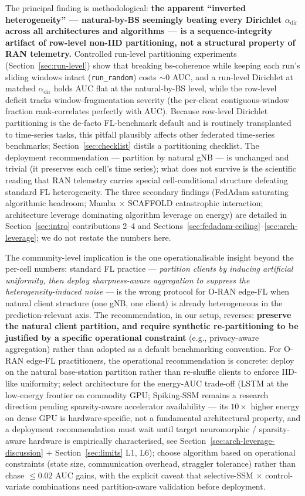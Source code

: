 \documentclass[journal]{IEEEtran}
\newcommand{\alphadir}{\ensuremath{\alpha_{\mathrm{dir}}}}
\begin{document}
The principal finding is methodological: \textbf{the apparent ``inverted heterogeneity'' --- natural-by-BS seemingly beating every Dirichlet $\alphadir$ across all architectures and algorithms --- is a sequence-integrity artifact of row-level non-IID partitioning, not a structural property of RAN telemetry.} Controlled run-level partitioning experiments (Section~\ref{sec:run-level}) show that breaking bs-coherence while keeping each run's sliding windows intact (\lstinline|run_random|) costs ${\sim}0$ AUC, and a run-level Dirichlet at matched $\alphadir$ holds AUC flat at the natural-by-BS level, while the row-level deficit tracks window-fragmentation severity (the per-client contiguous-window fraction rank-correlates perfectly with AUC). Because row-level Dirichlet partitioning is the de-facto FL-benchmark default and is routinely transplanted to time-series tasks, this pitfall plausibly affects other federated time-series benchmarks; Section~\ref{sec:checklist} distils a partitioning checklist. The deployment recommendation --- partition by natural gNB --- is unchanged and trivial (it preserves each cell's time series); what does not survive is the scientific reading that RAN telemetry carries special cell-conditional structure defeating standard FL heterogeneity. The three secondary findings (FedAdam saturating algorithmic headroom; Mamba $\times$ SCAFFOLD catastrophic interaction; architecture leverage dominating algorithm leverage on energy) are detailed in Section~\ref{sec:intro} contributions 2--4 and Sections~\ref{sec:fedadam-ceiling}--\ref{sec:arch-leverage}; we do not restate the numbers here.

The community-level implication is the one operationalisable insight beyond the per-cell numbers: standard FL practice --- \emph{partition clients by inducing artificial uniformity, then deploy sharpness-aware aggregation to suppress the heterogeneity-induced noise} --- is the wrong protocol for O-RAN edge-FL when natural client structure (one gNB, one client) is already heterogeneous in the prediction-relevant axis. The recommendation, in our setup, reverses: \textbf{preserve the natural client partition, and require synthetic re-partitioning to be justified by a specific operational constraint} (e.g., privacy-aware aggregation) rather than adopted as a default benchmarking convention. For O-RAN edge-FL practitioners, the operational recommendation is concrete: deploy on the natural base-station partition rather than re-shuffle clients to enforce IID-like uniformity; select architecture for the energy-AUC trade-off (LSTM at the low-energy frontier on commodity GPU; Spiking-SSM remains a research direction pending sparsity-aware accelerator availability --- its $10\times$ higher energy on dense GPU is hardware-specific, not a fundamental architectural property, and a deployment recommendation must wait until target neuromorphic / sparsity-aware hardware is empirically characterised, see Section~\ref{sec:arch-leverage-discussion} + Section~\ref{sec:limits} L1, L6); choose algorithm based on operational constraints (state size, communication overhead, straggler tolerance) rather than chase $\leq 0.02$ AUC gains, with the explicit caveat that selective-SSM $\times$ control-variate combinations need partition-aware validation before deployment.
\end{document}
